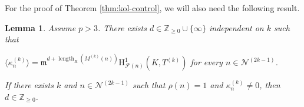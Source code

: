 \documentclass[10pt,reqno]{amsart}
\numberwithin{equation}{section}
\theoremstyle{plain}
\theoremstyle{definition}
\theoremstyle{definition}
\theoremstyle{plain}
\theoremstyle{plain}
\newtheorem{lemma}[thm]{Lemma}
\theoremstyle{plain}
\theoremstyle{plain}
\theoremstyle{plain}
\theoremstyle{plain}
\newcommand{\Z}{\mathbb{Z}}
\DeclareMathOperator{\length}{length}
\newcommand{\CF}{\mathcal{F}}
\newcommand{\cN}{\mathcal{N}}
\newcommand{\fm}{\mathfrak{m}}
\newcommand{\rH}{\mathrm{H}}
\begin{document}
For the proof of Theorem \ref{thm:kol-control}, we will also need the following result.
\begin{lemma}\label{lemma:j} Assume $p>3$.
There exists $d\in \Z_{\geq 0} \cup \{\infty\}$ independent on $k$ such that 
\begin{center}
$\langle\kappa_n^{(k)}\rangle = \fm^{d+ \length_R (M^{(k)}(n))}\rH^1_{\CF(n)}(K,T^{(k)})$ for every $n\in \cN^{(2k-1)}$.
\end{center}
If there exists $k$ and $n\in \cN^{(2k-1)}$ such that $\rho(n)=1$ and $\kappa_n^{(k)}\neq 0$, then $d \in \Z_{\geq 0}$.
\end{lemma}
\end{document}
